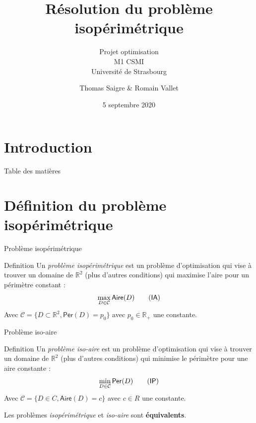 \documentclass[11pt,envcountsect,aspectratio=169]{beamer} %
\author[Thomas S. \& Romain V.]{Thomas Saigre \& Romain Vallet}
\title{Résolution du problème isopérimétrique}
\subtitle{Projet optimisation \\ M1 CSMI \\ Université de Strasbourg}
\date{5 septembre 2020}  %
\newcommand{\frametitre}{\begin{frame}
    \begin{center}
    {\Large\bf \secname}
    \end{center}
    \end{frame}
}
\newcommand{\R}{\mathbb{R}}
\newcommand{\C}{\mathcal{C}}
\newcommand{\A}{\mathsf{Aire}}
\newcommand{\p}{\mathsf{Per}}
\newcommand{\IA}{\textsf{IA}}
\newcommand{\IP}{\textsf{IP}}
\begin{document}
\begin{frame}[plain]
\titlepage
\end{frame}


\section[Introduction]{Introduction}




\begin{frame}{Table des matières}
\tableofcontents[hideallsubsections]
\end{frame}




\section{Définition du problème isopérimétrique}

\begin{frame}{Problème isopérimétrique}

\begin{beamerboxesrounded}[upper=titreB,lower=texteB,shadow=true]{Definition}
        Un \emph{problème isopérimétrique} est un problème d'optimisation qui vise à trouver un domaine de $\R^2$ (plus d'autres conditions) qui maximise l'aire pour un périmètre constant :
        \[\max_{D \in \C} \A(D) \label{ia}\tag{\IA}\]
        Avec $\mathcal{C} = \{ D \subset\R^2, \p(D) = p_0 \}$ avec $p_0\in \R_+$ une constante.
\end{beamerboxesrounded}

\end{frame}

\begin{frame}{Problème iso-aire}

\begin{beamerboxesrounded}[upper=titreB,lower=texteB,shadow=true]{Definition}
        Un \emph{problème iso-aire} est un problème d'optimisation qui vise à trouver un domaine de $\R^2$ (plus d'autres conditions) qui minimise le périmètre pour une aire constante :
        \[\min_{D \in \C} \p(D) \label{ip}\tag{\IP}\]
        Avec $\mathcal{C} = \{ D \in C, \A(D)=c \}$ avec $c \in R$ une constante.
\end{beamerboxesrounded}

Les problèmes \emph{isopérimétrique} et \emph{iso-aire} sont \textbf{équivalents}.

\end{frame}
\end{document}
